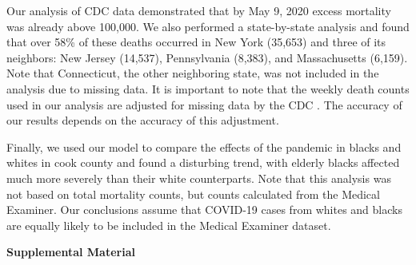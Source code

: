 \documentclass[11pt]{article}
\begin{document}
Our analysis of CDC data demonstrated that by May 9, 2020 excess mortality was already above 100,000. We also performed a state-by-state analysis and found that over 58\% of these deaths occurred in New York (35,653) and three of its neighbors: New Jersey (14,537), Pennsylvania (8,383), and Massachusetts (6,159). Note that Connecticut, the other neighboring state, was not included in the analysis due to missing data. It is important to note that the weekly death counts used in our analysis are adjusted for missing data by the CDC \cite{cdc2020covid19}. The accuracy of our results depends on the accuracy of this adjustment. 

Finally, we used our model to compare the effects of the pandemic in blacks and whites in cook county and found a disturbing trend, with elderly blacks affected much more severely than their white counterparts. Note that this analysis was not based on total mortality counts, but counts calculated from the Medical Examiner. Our conclusions assume that COVID-19 cases from whites and blacks are equally likely to be included in the Medical Examiner dataset. 




\newpage
\begin{center}
\LARGE{\textbf{Supplemental Material}}
\end{center}
\end{document}
